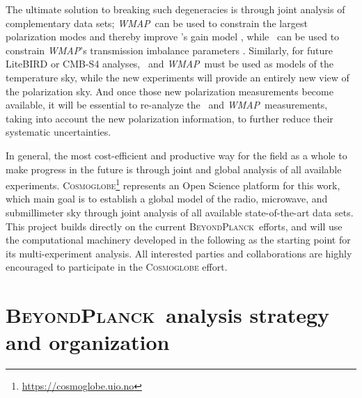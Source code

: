 \documentclass[twocolumn]{aa}
\def\WMAP{\emph{WMAP}}
\newcommand{\BP}{\textsc{BeyondPlanck}}
\begin{document}
The ultimate solution to breaking such degeneracies is through joint
analysis of complementary data sets; \WMAP\ can be used to constrain
the largest polarization modes and thereby improve \Planck's gain
model \citep{planck2016-l02}, while \Planck\ can be used to constrain
\WMAP's transmission imbalance parameters
\citep{jarosik2007}. Similarly, for future LiteBIRD or CMB-S4
analyses, \Planck\ and \WMAP\ must be used as models of the
temperature sky, while the new experiments will provide an entirely
new view of the polarization sky. And once those new polarization
measurements become available, it will be essential to re-analyze the
\Planck\ and \WMAP\ measurements, taking into account the new
polarization information, to further reduce their systematic
uncertainties.

In general, the most cost-efficient and productive way for the field
as a whole to make progress in the future is through joint and global
analysis of all available experiments.
\textsc{Cosmoglobe}\footnote{\url{https://cosmoglobe.uio.no}}
represents an Open Science platform for this work, which main goal is
to establish a global model of the radio, microwave, and submillimeter
sky through joint analysis of all available state-of-the-art data
sets. This project builds directly on the current \BP\ efforts, and
will use the computational machinery developed in the following as the
starting point for its multi-experiment analysis. All interested
parties and collaborations are highly encouraged to participate in the
\textsc{Cosmoglobe} effort.


\section{\BP\ analysis strategy and organization}
\label{sec:overview}
\end{document}
